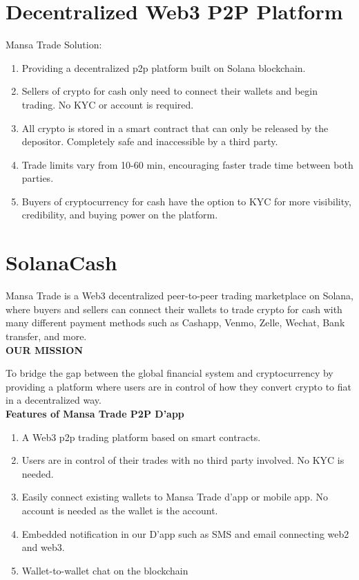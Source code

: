 \documentclass{article}
\begin{document}
\section{Decentralized Web3 P2P Platform}\normalsize
Mansa Trade Solution:
\begin{enumerate}
    \item Providing a decentralized p2p platform built on Solana blockchain.
    \item Sellers of crypto for cash only need to connect their wallets and begin trading. No KYC or account is required.
    \item All crypto is stored in a smart contract that can only be released by the depositor. Completely safe and inaccessible by a third party.
    \item Trade limits vary from 10-60 min, encouraging faster trade time between both parties.
    \item Buyers of cryptocurrency for cash have the option to KYC for more visibility, credibility, and buying power on the platform.
\end{enumerate}

\section{SolanaCash}
Mansa Trade is a Web3 decentralized peer-to-peer trading marketplace on Solana, where buyers and sellers can connect their wallets to trade crypto for cash with many different payment methods such as Cashapp, Venmo, Zelle, Wechat, Bank transfer, and more.\\

\textbf{OUR MISSION}

To bridge the gap between the global financial system and cryptocurrency by providing a platform where users are in control of how they convert crypto to fiat in a decentralized way. \\

\textbf{Features of Mansa Trade P2P D’app}
\begin{enumerate}
    \item A Web3 p2p trading platform based on smart contracts.
    \item Users are in control of their trades with no third party involved. No KYC is needed.
    \item Easily connect existing wallets to Mansa Trade d’app or mobile app. No account is needed as the wallet is the account.
    \item Embedded notification in our D'app such as SMS and email connecting web2 and web3.
    \item Wallet-to-wallet chat on the blockchain
\end{enumerate}
\end{document}
